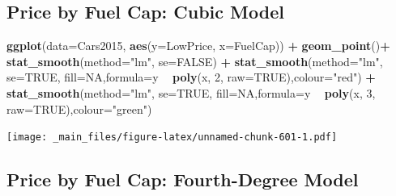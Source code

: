 \documentclass[]{book}
\newenvironment{Shaded}{\begin{snugshade}}{\end{snugshade}}
\newcommand{\KeywordTok}[1]{\textcolor[rgb]{0.13,0.29,0.53}{\textbf{#1}}}
\newcommand{\DataTypeTok}[1]{\textcolor[rgb]{0.13,0.29,0.53}{#1}}
\newcommand{\DecValTok}[1]{\textcolor[rgb]{0.00,0.00,0.81}{#1}}
\newcommand{\StringTok}[1]{\textcolor[rgb]{0.31,0.60,0.02}{#1}}
\newcommand{\OtherTok}[1]{\textcolor[rgb]{0.56,0.35,0.01}{#1}}
\newcommand{\OperatorTok}[1]{\textcolor[rgb]{0.81,0.36,0.00}{\textbf{#1}}}
\newcommand{\NormalTok}[1]{#1}
\begin{document}
\subsection{Price by Fuel Cap: Cubic
Model}\label{price-by-fuel-cap-cubic-model}

\begin{Shaded}
\begin{Highlighting}[]
\KeywordTok{ggplot}\NormalTok{(}\DataTypeTok{data=}\NormalTok{Cars2015, }\KeywordTok{aes}\NormalTok{(}\DataTypeTok{y=}\NormalTok{LowPrice, }\DataTypeTok{x=}\NormalTok{FuelCap)) }\OperatorTok{+}\StringTok{ }\KeywordTok{geom_point}\NormalTok{()}\OperatorTok{+}\StringTok{ }\KeywordTok{stat_smooth}\NormalTok{(}\DataTypeTok{method=}\StringTok{"lm"}\NormalTok{, }\DataTypeTok{se=}\OtherTok{FALSE}\NormalTok{) }\OperatorTok{+}
\StringTok{ }\KeywordTok{stat_smooth}\NormalTok{(}\DataTypeTok{method=}\StringTok{"lm"}\NormalTok{, }\DataTypeTok{se=}\OtherTok{TRUE}\NormalTok{, }\DataTypeTok{fill=}\OtherTok{NA}\NormalTok{,}\DataTypeTok{formula=}\NormalTok{y }\OperatorTok{~}\StringTok{ }\KeywordTok{poly}\NormalTok{(x, }\DecValTok{2}\NormalTok{, }\DataTypeTok{raw=}\OtherTok{TRUE}\NormalTok{),}\DataTypeTok{colour=}\StringTok{"red"}\NormalTok{) }\OperatorTok{+}\StringTok{ }
\StringTok{  }\KeywordTok{stat_smooth}\NormalTok{(}\DataTypeTok{method=}\StringTok{"lm"}\NormalTok{, }\DataTypeTok{se=}\OtherTok{TRUE}\NormalTok{, }\DataTypeTok{fill=}\OtherTok{NA}\NormalTok{,}\DataTypeTok{formula=}\NormalTok{y }\OperatorTok{~}\StringTok{ }\KeywordTok{poly}\NormalTok{(x, }\DecValTok{3}\NormalTok{, }\DataTypeTok{raw=}\OtherTok{TRUE}\NormalTok{),}\DataTypeTok{colour=}\StringTok{"green"}\NormalTok{)}
\end{Highlighting}
\end{Shaded}

\texttt{[image: \_main\_files/figure-latex/unnamed-chunk-601-1.pdf]}

\subsection{Price by Fuel Cap: Fourth-Degree
Model}\label{price-by-fuel-cap-fourth-degree-model}
\end{document}
